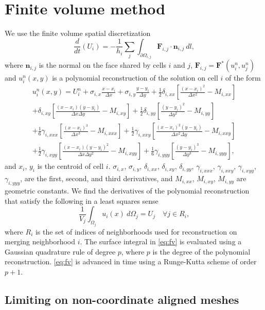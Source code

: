 
\section{Finite volume method}
We use the finite volume spatial discretization 
\begin{equation} \label{eq:fv}
\frac{d}{dt}(U_i) =  - \frac{1}{h_i}\sum_{j} \int_{\partial \Omega_{i,j}} \mathbf{F}_{i,j} \cdot \mathbf{n}_{i,j}~dl,
\end{equation}
where $\mathbf{n}_{i,j}$ is the normal on the face shared by cells $i$ and $j$, $\mathbf{F}_{i,j} = \mathbf{F}^*(u^n_{i},u^n_{j})$ and $u^n_{i}(x,y)$ is a polynomial reconstruction of the solution on cell $i$ of the form
\begin{equation}\label{eq:u}
\begin{aligned}
	    u^n_i(x,y) = U^n_{i} +  \sigma_{i,x}\frac{x- x_i}{\Delta x} +   \sigma_{i,y}\frac{y- y_i}{\Delta y} + \frac{1}{2} \delta_{i, xx}\left[ \frac{(x -  x_i)^2 }{\Delta x^2} -  M_{i,xx}\right]\\
	    + \delta_{i, xy}\left[ \frac{(x -  x_i) (y -  y_i) }{\Delta x \Delta y} -  M_{i,xy}\right] + \frac{1}{2} \delta_{i, yy}\left[ \frac{(y -  y_i)^2 }{\Delta y^2} -   M_{i,yy}\right]\\
	     + \frac{1}{6}\gamma_{i, xxx}\left[ \frac{(x -  x_i)^3 }{\Delta x^3} -  M_{i,xxx}\right] + \frac{1}{2}\gamma_{i, xxy}\left[ \frac{(x -  x_i)^2 (y -  y_i) }{\Delta x^2 \Delta y} -  M_{i,xxy}\right]\\
	     + \frac{1}{2}\gamma_{i, xyy}\left[ \frac{(x -  x_i) (y -  y_i)^2 }{\Delta x \Delta y ^2} -  M_{i,xyy}\right]+ \frac{1}{6}\gamma_{i, yyy}\left[ \frac{(y -  y_i)^3 }{\Delta y^3} -  M_{i,yyy}\right],
\end{aligned}
\end{equation}
and $ x_i$, $ y_i$ is the centroid of cell $i$. $\sigma_{i,x}$, $ \sigma_{i,y}$, $ \delta_{i,xx}$, $ \delta_{i,xy}$, $ \delta_{i,yy}$, $ \gamma_{i,xxx}$, $ \gamma_{i,xxy}$, $ \gamma_{i,xyy}$, $ \gamma_{i,yyy}$, are the first, second, and third derivatives, and $  M_{i,xx}$, $ M_{i,xy}$,  $ M_{i,yy}$ are geometric constants. We find the derivatives of the polynomial reconstruction that satisfy the following in a least squares sense
\begin{equation}\label{eq:qi}
\frac{1}{ V_j}\int_{\Omega_j} u_i(x)~d\Omega_j = U_j \quad \forall j \in R_i,
\end{equation}
where $R_i$ is the set of indices of neighborhoods used for reconstruction on merging neighborhood $i$.  The surface integral in \eqref{eq:fv} is evaluated using a Gaussian quadrature rule of degree $p$, where $p$ is the degree of the polynomial reconstruction.  \eqref{eq:fv} is advanced in time using a Runge-Kutta scheme of order $p+1$.
\subsection{Limiting on non-coordinate aligned meshes}